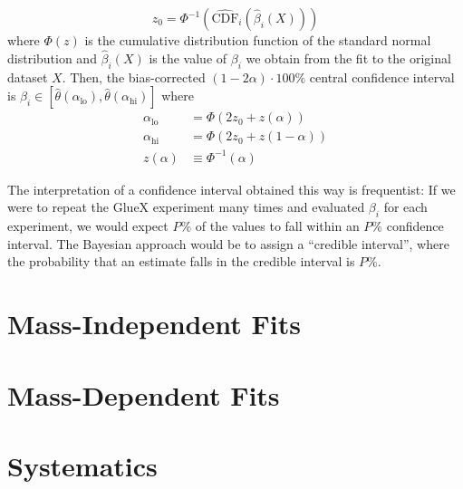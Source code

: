 \begin{equation}
  z_0 = \Phi^{-1}\left(\hat{\text{CDF}}_i(\hat{\beta}_i(X))\right)
\end{equation}
where $\Phi(z)$ is the cumulative distribution function of the standard normal distribution and $\hat{\beta}_i(X)$ is the value of $\beta_i$ we obtain from the fit to the original dataset $X$. Then, the bias-corrected $(1-2\alpha)\cdot 100\%$ central confidence interval is $\beta_i \in \left[\hat{\theta}(\alpha_\text{lo}),\hat{\theta}(\alpha_\text{hi})\right]$ where
\begin{align}
  \alpha_\text{lo} &= \Phi\left(2z_0 + z(\alpha)\right) \\
  \alpha_\text{hi} &= \Phi\left(2z_0 + z(1-\alpha)\right) \\
  z(\alpha) &\equiv \Phi^{-1}(\alpha)
\end{align}

The interpretation of a confidence interval obtained this way is frequentist: If we were to repeat the GlueX experiment many times and evaluated $\beta_i$ for each experiment, we would expect $P\%$ of the values to fall within an $P\%$ confidence interval. The Bayesian approach would be to assign a ``credible interval'', where the probability that an estimate falls in the credible interval is $P\%$.

\section{Mass-Independent Fits}\label{sec:mass-independent-fits}
\section{Mass-Dependent Fits}\label{sec:mass-dependent-fits}
\section{Systematics}
